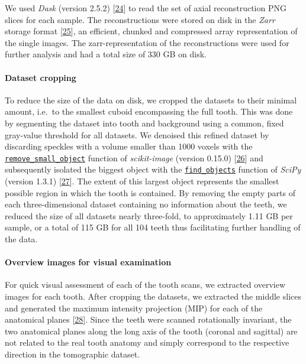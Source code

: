 \documentclass[
  american,
]{article}
\begin{document}
We used \emph{Dask} (version 2.5.2) {[}\protect\hyperlink{ref-hj1CnyWB}{24}{]} to read the set of axial reconstruction PNG slices for each sample.
The reconstructions were stored on disk in the \emph{Zarr} storage format {[}\protect\hyperlink{ref-10Fk3ASPz}{25}{]}, an efficient, chunked and compressed array representation of the single images.
The zarr-representation of the reconstructions were used for further analysis and had a total size of 330 GB on disk.

\hypertarget{dataset-cropping}{%
\paragraph{Dataset cropping}\label{dataset-cropping}}

To reduce the size of the data on disk, we cropped the datasets to their minimal amount, i.e.~to the smallest cuboid encompassing the full tooth.
This was done by segmenting the dataset into tooth and background using a common, fixed gray-value threshold for all datasets.
We denoised this refined dataset by discarding speckles with a volume smaller than 1000 voxels with the \href{https://scikit-image.org/docs/dev/api/skimage.morphology.html\#skimage.morphology.remove_small_objects}{\texttt{remove\_small\_object}} function of \emph{scikit-image} (version 0.15.0) {[}\protect\hyperlink{ref-stvWEJeu}{26}{]} and subsequently isolated the biggest object with the \href{https://docs.scipy.org/doc/scipy/reference/generated/scipy.ndimage.find_objects.html}{\texttt{find\_objects}} function of \emph{SciPy} (version 1.3.1) {[}\protect\hyperlink{ref-8Miti2Gz}{27}{]}.
The extent of this largest object represents the smallest possible region in which the tooth is contained.
By removing the empty parts of each three-dimensional dataset containing no information about the teeth, we reduced the size of all datasets nearly three-fold, to approximately 1.11 GB per sample, or a total of 115 GB for all 104 teeth thus facilitating further handling of the data.

\hypertarget{overview-images-for-visual-examination}{%
\paragraph{Overview images for visual examination}\label{overview-images-for-visual-examination}}

For quick visual assessment of each of the tooth scans, we extracted overview images for each tooth.
After cropping the datasets, we extracted the middle slices and generated the maximum intensity projection (MIP) for each of the anatomical planes {[}\protect\hyperlink{ref-ydSnvH5h}{28}{]}.
Since the teeth were scanned rotationally invariant, the two anatomical planes along the long axis of the tooth (coronal and sagittal) are not related to the real tooth anatomy and simply correspond to the respective direction in the tomographic dataset.
\end{document}
